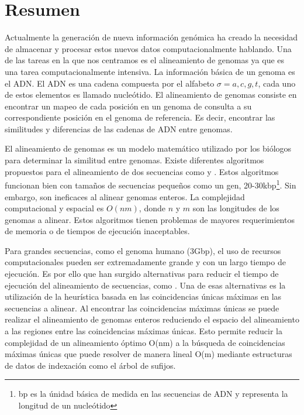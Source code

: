 \documentclass[12pt,a4paper]{article}
\begin{document}
\section{Resumen}
\indent
Actualmente la generación de nueva información genómica ha creado la necesidad de almacenar y procesar estos nuevos datos computacionalmente hablando. Una de las tareas en la que nos centramos es el alineamiento de genomas ya que es una tarea computacionalmente intensiva. La información básica de un genoma es el ADN. El ADN es una cadena compuesta por el alfabeto $\sigma={a,c,g,t}$, cada uno de estos elementos es llamado nucleótido. El alineamiento de genomas consiste en encontrar un mapeo de cada posición en un genoma de consulta a su correspondiente posición en el genoma de referencia. Es decir, encontrar las similitudes y diferencias de las cadenas de ADN entre genomas.

El alineamiento de genomas es un modelo matemático utilizado por los biólogos para determinar la similitud entre genomas. Existe diferentes algoritmos propuestos para el alineamiento de dos secuencias como \cite{Needleman1970General} y \cite{Waterman}. Estos algoritmos funcionan bien con tamaños de secuencias pequeños como un gen, 20-30kbp\footnote{bp es la únidad básica de medida en las secuencias de ADN y representa la longitud de un nucleótido}. Sin embargo, son ineficaces al alinear genomas enteros. La complejidad computacional y espacial es $O(nm)$, donde $n$ y $m$ son las longitudes de los genomas a alinear. Estos algoritmos tienen problemas de mayores requerimientos de memoria o de tiempos de ejecución inaceptables.

Para grandes secuencias, como el genoma humano (3Gbp), el uso de recursos computacionales pueden ser extremadamente grande y con un largo tiempo de ejecución. Es por ello que han surgido alternativas para reducir el tiempo de ejecución del alineamiento de secuencias, como \cite{Mongelli,Kouzinopoulos2005,Encarnac2011,Vyverman2013,OguzhanKulekci2011,Khan2009,OhlebuschGK10}. Una de esas alternativas es la utilización de la heurística basada en las coincidencias \'unicas máximas en las secuencias a alinear. Al encontrar las coincidencias máximas  únicas se puede realizar el alineamiento de genomas enteros reduciendo el espacio del alineamiento a las regiones entre las coincidencias máximas únicas. Esto permite reducir la complejidad de un alineamiento \'optimo O(nm) a la b\'usqueda de coincidencias m\'aximas \'unicas que puede resolver de manera lineal O(m) mediante estructuras de datos de indexaci\'on como el \'arbol de sufijos.\\
\end{document}
